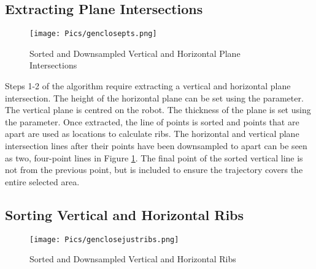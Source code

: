 \subsection{Extracting Plane Intersections}


\begin{figure}[H]
    \centering
    \texttt{[image: Pics/genclosepts.png]}
    \caption{Sorted and Downsampled Vertical and Horizontal Plane Intersections}
    \label{fig:sortedintersections}
\end{figure}

Steps 1-2 of the algorithm require extracting a vertical and horizontal plane intersection. The height of the horizontal plane can be set using the  parameter. The vertical plane is centred on the robot. The thickness of the plane is set using the  parameter. Once extracted, the line of points is sorted and points that are  apart are used as locations to calculate ribs. The horizontal and vertical plane intersection lines after their points have been downsampled to  apart can be seen as two, four-point lines in Figure \ref{fig:sortedintersections}. The final point of the sorted vertical line is not  from the previous point, but is included to ensure the trajectory covers the entire selected area.\\

\subsection{Sorting Vertical and Horizontal Ribs}
\label{sec:sortlines}
\begin{figure}[H]
    \centering
    \texttt{[image: Pics/genclosejustribs.png]}
    \caption{Sorted and Downsampled Vertical and Horizontal Ribs}
    \label{fig:ribs}
\end{figure}


